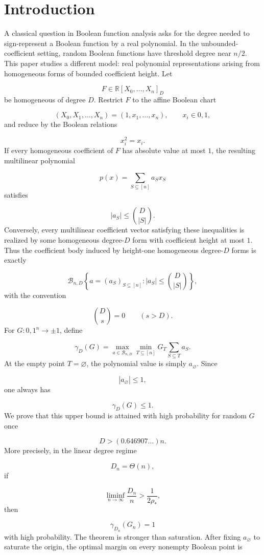 \documentclass[11pt]{article}
\theoremstyle{definition}
\begin{document}
\section{Introduction}
A classical question in Boolean function analysis asks for the degree needed to sign-represent a Boolean function by a real polynomial. In the unbounded-coefficient setting, random Boolean functions have threshold degree near $n/2$. This paper studies a different model: real polynomial representations arising from homogeneous forms of bounded coefficient height. Let

\[
F\in \mathbb{R}[X_0,\dots,X_n]_D
\]
be homogeneous of degree $D$. Restrict $F$ to the affine Boolean chart

\[
(X_0,X_1,\dots,X_n)=(1,x_1,\dots,x_n),
\qquad x_i\in{0,1},
\]
and reduce by the Boolean relations

\[
x_i^2=x_i.
\]
If every homogeneous coefficient of $F$ has absolute value at most $1$, the resulting multilinear polynomial

\[
p(x)=\sum_{S\subseteq[n]}a_Sx_S
\]
satisfies

\[
|a_S|\le \binom{D}{|S|}.
\]
Conversely, every multilinear coefficient vector satisfying these inequalities is realized by some homogeneous degree-$D$ form with coefficient height at most $1$. Thus the coefficient body induced by height-one homogeneous degree-$D$ forms is exactly

\[
\mathcal B_{n,D}
\left\{
a=(a_S)_{S\subseteq[n]}:
|a_S|\le \binom{D}{|S|}
\right\},
\]
with the convention

\[
\binom{D}{s}=0
\qquad (s>D).
\]
For $G:{0,1}^n\to{\pm1}$, define

\[
\gamma_D(G)=
\max_{a\in\mathcal B_{n,D}}
\min_{T\subseteq[n]}
G_T\sum_{S\subseteq T}a_S.
\]
At the empty point $T=\varnothing$, the polynomial value is simply $a_\varnothing$. Since

\[
|a_\varnothing|\le 1,
\]
one always has

\[
\gamma_D(G)\le1.
\]
We prove that this upper bound is attained with high probability for random $G$ once

\[
D>(0.646907\ldots)n.
\]
More precisely, in the linear degree regime

\[
D_n=\Theta(n),
\]
if

\[
\liminf_{n\to\infty}\frac{D_n}{n}>
\frac1{2\rho_*},
\]
then

\[
\gamma_{D_n}(G_n)=1
\]
with high probability. The theorem is stronger than saturation. After fixing $a_\varnothing$ to saturate the origin, the optimal margin on every nonempty Boolean point is
\end{document}
